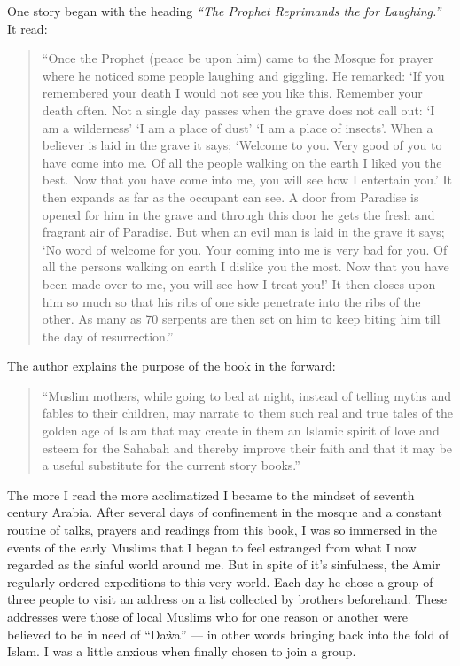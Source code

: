 \documentclass[12pt]{memoir}
\begin{document}
One story began with the heading
\emph{“The Prophet Reprimands the 
for Laughing.”}
It read:

\begin{quote}
“Once the Prophet (peace be upon him) came to the Mosque for prayer
where he noticed some people laughing and giggling.
He remarked: ‘If you remembered your death I would not see you like this.
Remember your death often.
Not a single day passes when the grave does not call out:
‘I am a wilderness’ ‘I am a place of dust’ ‘I am a place of insects’.
When a believer is laid in the grave it says;
‘Welcome to you.
Very good of you to have come into me.
Of all the people walking on the earth I liked you the best.
Now that you have come into me, you will see how I entertain you.’
It then expands as far as the occupant can see.
A door from Paradise is opened for him in the grave
and through this door he gets the fresh and fragrant air of Paradise.
But when an evil man is laid in the grave it says;
‘No word of welcome for you.
Your coming into me is very bad for you.
Of all the persons walking on earth I dislike you the most.
Now that you have been made over to me, you will see how I treat you!’
It then closes upon him so much so that his ribs
of one side penetrate into the ribs of the other.
As many as 70 serpents are then set on him
to keep biting him till the day of resurrection.”
\end{quote}

The author explains the purpose of the book in the forward:

\begin{quote}
“Muslim mothers, while going to bed at night,
instead of telling myths and fables to their children,
may narrate to them such real and true tales of the golden age of Islam
that may create in them an Islamic spirit of love and esteem for the Sahabah
and thereby improve their faith and that it may be
a useful substitute for the current story books.”
\end{quote}

The more I read the more acclimatized I became
to the mindset of seventh century Arabia.
After several days of confinement in the mosque
and a constant routine of talks, prayers and readings from this book,
I was so immersed in the events of the early Muslims
that I began to feel estranged from what I now regarded
as the sinful world around me.
But in spite of it’s sinfulness,
the Amir regularly ordered expeditions to this very world.
Each day he chose a group of three people to visit an address
on a list collected by brothers beforehand.
These addresses were those of local Muslims
who for one reason or another were believed to be in need of “Da\`wa” —
in other words bringing back into the fold of Islam.
I was a little anxious when finally chosen to join a group.
\end{document}
